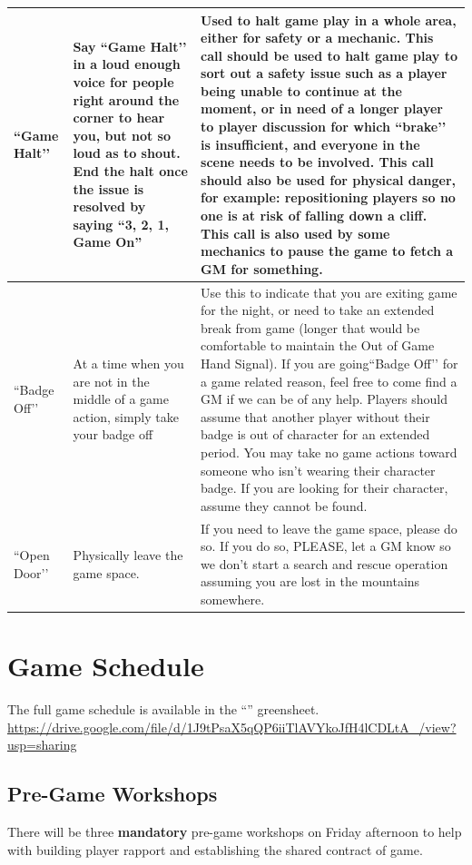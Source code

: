 \documentclass[sheet]{GL2020}
\begin{document}
\begin{tabularx}{\textwidth}{|>{\centering\arraybackslash} m{1.5cm} | >{\centering\arraybackslash} m{2.5cm} | >{\centering\arraybackslash}X |}
    \hline
``Game Halt’’ & Say ``Game Halt’’ in a loud enough voice for people right around the corner to hear you, but not so loud as to shout. End the halt once the issue is resolved by saying “3, 2, 1, Game On” &  Used to halt game play in a whole area, either for safety or a mechanic. This call should be used to halt game play to sort out a safety issue such as a player being unable to continue at the moment, or in need of a longer player to player discussion for which ``brake’’ is insufficient, and everyone in the scene needs to be involved. This call should also be used for physical danger, for example: repositioning players so no one is at risk of falling down a cliff. This call is also used by some mechanics to pause the game to fetch a GM for something. \\
    \hline
``Badge Off’’ & At a time when you are not in the middle of a game action, simply take your badge off & Use this to indicate that you are exiting game for the night, or need to take an extended break from game (longer that would be comfortable to maintain the Out of Game Hand Signal). If you are going``Badge Off’’ for a game related reason, feel free to come find a GM if we can be of any help. Players should assume that another player without their badge is out of character for an extended period. You may take no game actions toward someone who isn’t wearing their character badge. If you are looking for their character, assume they cannot be found. \\
    \hline
``Open Door’’ & Physically leave the game space. & If you need to leave the game space, please do so. If you do so, PLEASE, let a GM know so we don't start a search and rescue operation assuming you are lost in the mountains somewhere. \\
    \hline
\end{tabularx}

\section{Game Schedule}
The full game	schedule is available in the ``\gWeekendSchedule{\MYname}'' greensheet. \url{https://drive.google.com/file/d/1J9tPsaX5qQP6iiTlAVYkoJfH4lCDLtA_/view?usp=sharing}

\subsection{Pre-Game Workshops}
There will be three \textbf{mandatory} pre-game workshops on Friday afternoon to help with building player rapport and establishing the shared contract of game.
\end{document}
